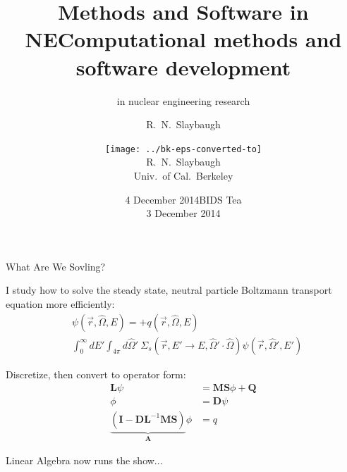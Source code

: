 \documentclass[xcolor=x11names,compress]{beamer}
\title{Methods and Software in NE}
\author{R.\ N.\ Slaybaugh}
\date{4 December 2014}
\renewcommand{\(}{\begin{columns}}
\renewcommand{\)}{\end{columns}}
\newcommand{\<}[1]{\begin{column}{#1}}
\renewcommand{\>}{\end{column}}
\newcommand{\Macro}{\ensuremath{\Sigma}}
\newcommand{\vOmega}{\ensuremath{\hat{\Omega}}}
\newcommand{\ve}[1]{\ensuremath{\mathbf{#1}}}
\begin{document}
\begin{frame}
\title{Computational methods and software development }
\subtitle{in nuclear engineering research}
\author{
        \texttt{[image: ../bk-eps-converted-to]}\\R.\ N.\ Slaybaugh \\ Univ.\ of Cal.\ Berkeley}

\date{BIDS Tea \\ 3 December 2014}
\titlepage
\end{frame}

\begin{frame}{What Are We Sovling?}

    I study how to solve the steady state, neutral particle Boltzmann transport equation
    more efficiently:
    \begin{align}
    [\vOmega \cdot \nabla + \Macro(\vec{r}, E)] &\psi(\vec{r}, \vOmega, E)  =  + q(\vec{r}, \vOmega, E) \nonumber\\
     &\int_0^{\infty} dE' \int_{4\pi} d\vOmega' \:\Macro_{s}(\vec{r}, E' \to E,
     \vOmega' \cdot \vOmega) \psi(\vec{r}, \vOmega', E') \nonumber
    \end{align}

    Discretize, then convert to operator form:
    \begin{align}
    \mathbf{L} \psi &= \mathbf{MS}\phi + \mathbf{Q} \nonumber\\
    \phi &= \mathbf{D}\psi \nonumber \\
    \underbrace{(\ve{I} - \ve{DL}^{-1}\ve{MS})}_{\mathbf{A}}\phi &= q\nonumber
    \end{align}
    
    \textcolor{dgreen}{Linear Algebra} now runs the show...
    
\end{frame}
\end{document}
